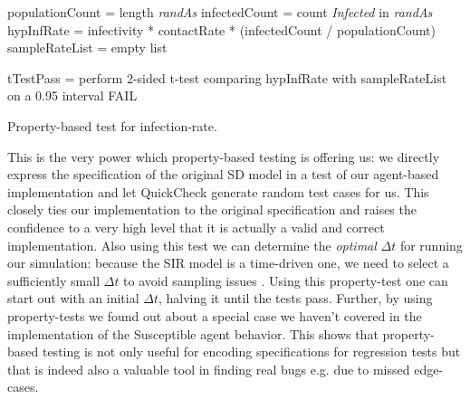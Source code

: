 \begin{algorithm}
populationCount = length \textit{randAs}\;
infectedCount   = count \textit{Infected} in \textit{randAs}\;
hypInfRate      = infectivity * contactRate * (infectedCount / populationCount)\;
sampleRateList  = empty list\;


tTestPass = perform 2-sided t-test comparing hypInfRate with sampleRateList on a 0.95 interval\;
 {
  FAIL\;
}
\caption{Property-based test for infection-rate.}
\label{alg:prop_test_infectionrate}
\end{algorithm}

This is the very power which property-based testing is offering us: we directly express the specification of the original SD model in a test of our agent-based implementation and let QuickCheck generate random test cases for us. This closely ties our implementation to the original specification and raises the confidence to a very high level that it is actually a valid and correct implementation. Also using this test we can determine the \textit{optimal} $\Delta t$ for running our simulation: because the SIR model is a time-driven one, we need to select a sufficiently small $\Delta t$ to avoid sampling issues \cite{thaler_pure_2018}. Using this property-test one can start out with an initial $\Delta t$, halving it until the tests pass.
Further, by using property-tests we found out about a special case we haven't covered in the implementation of the Susceptible agent behavior. This shows that property-based testing is not only useful for encoding specifications for regression tests but that is indeed also a valuable tool in finding real bugs e.g. due to missed edge-cases. 